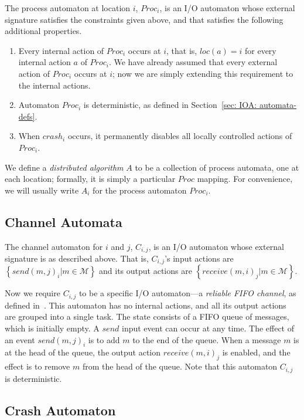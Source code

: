 \documentclass[11pt]{article}
\numberwithin{theorem}{section}
\newcommand{\set}[1]{\left\{#1\right\}}
\begin{document}
The process automaton at location $i$, $Proc_i$, is an I/O automaton
whose external signature satisfies the constraints given above, and
that satisfies the following additional properties.
\begin{enumerate}
\item
Every internal action of $Proc_i$ occurs at $i$, that is,
$loc(a) = i$ for every internal action $a$ of $Proc_i$.  
We have already assumed that every external action of $Proc_i$ occurs
at $i$; now we are simply extending this requirement to the internal
actions.



\item
Automaton $Proc_i$ is deterministic, as defined in Section~\ref{sec:
  IOA:  automata-defs}.

\item
When $crash_i$ occurs, it permanently disables all locally controlled
actions of $Proc_i$.  
\end{enumerate}

We define a \emph{distributed algorithm} $A$ to be a collection of
process automata, one at each location; formally, it is simply a
particular $Proc$ mapping.  
For convenience, we will usually write $A_i$ for the process automaton
$Proc_i$.

\subsection{Channel Automata}
\label{subsec:channelAutomata}

The channel automaton for $i$ and $j$, $C_{i,j}$, is an I/O automaton
whose external signature is as described above.
That is, $C_{i,j}$'s input actions are $ \set{   send(m,j)_i | m \in
  \mathcal{M}}$ and its output actions are $\set{receive(m,i)_j | m
  \in \mathcal{M}}$.

Now we require $C_{i,j}$ to be a specific I/O automaton---a
\emph{reliable FIFO channel}, as defined in~\cite{lync:da}.
This automaton has no internal actions, and all its output actions are
grouped into a single task.
The state consists of a FIFO queue of messages, which is initially empty.
A $send$ input event can occur at any time. 
The effect of an event $send(m,j)_i$ is to add $m$ to the end of the
queue. 
When a message $m$ is at the head of the queue, the output action
$receive(m,i)_j$ is enabled, and the effect is to remove $m$ from the
head of the queue.
Note that this automaton $C_{i,j}$ is deterministic.

\subsection{Crash Automaton}
\label{subsec:crashAutomaton}
\end{document}
